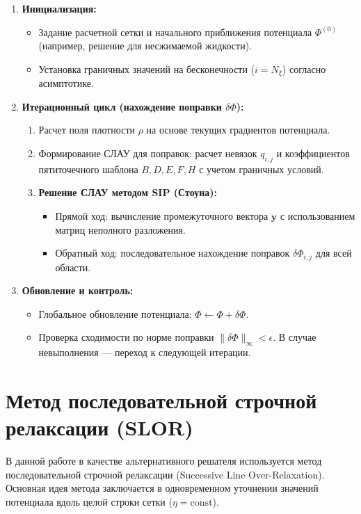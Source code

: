 \documentclass[a4paper,12pt]{article}
\begin{document}
	\begin{enumerate}
		\item \textbf{Инициализация:}
		\begin{itemize}
			\item Задание расчетной сетки и начального приближения потенциала $\Phi^{(0)}$ (например, решение для несжимаемой жидкости).
			\item Установка граничных значений на бесконечности ($i=N_\xi$) согласно асимптотике.
		\end{itemize}
		
		\item \textbf{Итерационный цикл (нахождение поправки $\delta\Phi$):}
		\begin{enumerate}
			\item Расчет поля плотности $\rho$ на основе текущих градиентов потенциала.
			\item Формирование СЛАУ для поправок: расчет невязок $q_{i,j}$ и коэффициентов пятиточечного шаблона $B, D, E, F, H$ с учетом граничных условий.
			\item \textbf{Решение СЛАУ методом SIP (Стоуна):}
			\begin{itemize}
				\item Прямой ход: вычисление промежуточного вектора $\mathbf{y}$ с использованием матриц неполного разложения.
				\item Обратный ход: последовательное нахождение поправок $\delta\Phi_{i,j}$ для всей области.
			\end{itemize}
		\end{enumerate}
		
		\item \textbf{Обновление и контроль:}
		\begin{itemize}
			\item Глобальное обновление потенциала: $\Phi \leftarrow \Phi + \delta \Phi$.
			\item Проверка сходимости по норме поправки $\|\delta \Phi\|_\infty < \epsilon$. В случае невыполнения — переход к следующей итерации.
		\end{itemize}
	\end{enumerate}



	\section{Метод последовательной строчной релаксации (SLOR)}

	В данной работе в качестве альтернативного решателя используется метод последовательной строчной релаксации (Successive Line Over-Relaxation). Основная идея метода заключается в одновременном уточнении значений потенциала вдоль целой строки сетки ($\eta = \text{const}$). 
\end{document}

